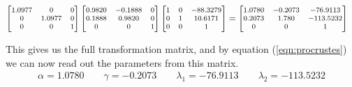\begin{align}
    \footnotesize
    \begin{bmatrix}
        1.0977 & 0 & 0 \\
        0 & 1.0977 & 0 \\
        0 & 0 & 1
    \end{bmatrix}
    \begin{bmatrix}
        0.9820 & -0.1888 & 0 \\
        0.1888 & 0.9820 & 0 \\
        0 & 0 & 1
    \end{bmatrix}
    \begin{bmatrix}
        1 & 0 & -88.3279 \\
        0 & 1 & 10.6171 \\
        0 & 0 & 1
    \end{bmatrix}
    &=
    \footnotesize
    \begin{bmatrix}
        1.0780 & -0.2073 & -76.9113 \\
        0.2073 & 1.780 & -113.5232 \\
        0 & 0 & 1
    \end{bmatrix}
\end{align}

This gives us the full transformation matrix, and by equation
(\ref{eqn:procrustes}) we can now read out the parameters from this matrix.
\begin{align}
    \alpha = 1.0780 \qquad
    \gamma = -0.2073 \qquad
    \lambda_1 = -76.9113 \qquad
    \lambda_2 = -113.5232
\end{align}

